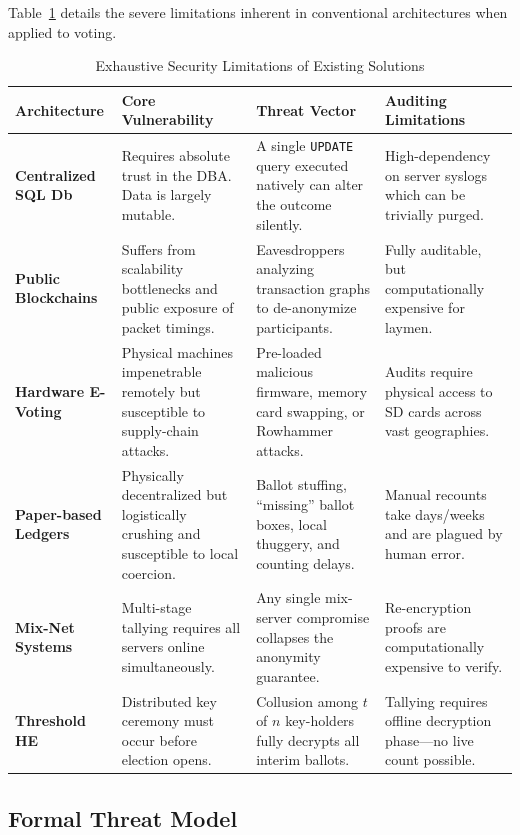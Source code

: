 \documentclass[journal,10pt,twocolumn]{IEEEtran}
\begin{document}
Table~\ref{tab:limitations_detailed} details the severe limitations inherent in conventional architectures when applied to voting.

\begin{table}[t]
\caption{Exhaustive Security Limitations of Existing Solutions}
\label{tab:limitations_detailed}
\begin{tabularx}{\linewidth}{|l|X|X|X|}
\hline
\rowcolor{chainblue!15}
\textbf{Architecture} & \textbf{Core Vulnerability} & \textbf{Threat Vector} & \textbf{Auditing Limitations} \\
\hline
\textbf{Centralized SQL Db} & Requires absolute trust in the DBA. Data is largely mutable. & A single \texttt{UPDATE} query executed natively can alter the outcome silently. & High-dependency on server syslogs which can be trivially purged. \\
\hline
\textbf{Public Blockchains} & Suffers from scalability bottlenecks and public exposure of packet timings. & Eavesdroppers analyzing transaction graphs to de-anonymize participants. & Fully auditable, but computationally expensive for laymen. \\
\hline
\textbf{Hardware E-Voting} & Physical machines impenetrable remotely but susceptible to supply-chain attacks. & Pre-loaded malicious firmware, memory card swapping, or Rowhammer attacks. & Audits require physical access to SD cards across vast geographies. \\
\hline
\textbf{Paper-based Ledgers} & Physically decentralized but logistically crushing and susceptible to local coercion. & Ballot stuffing, ``missing'' ballot boxes, local thuggery, and counting delays. & Manual recounts take days/weeks and are plagued by human error. \\
\hline
\textbf{Mix-Net Systems} & Multi-stage tallying requires all servers online simultaneously. & Any single mix-server compromise collapses the anonymity guarantee. & Re-encryption proofs are computationally expensive to verify. \\
\hline
\textbf{Threshold HE} & Distributed key ceremony must occur before election opens. & Collusion among $t$ of $n$ key-holders fully decrypts all interim ballots. & Tallying requires offline decryption phase---no live count possible. \\
\hline
\end{tabularx}
\end{table}

\subsection{Formal Threat Model}
\end{document}
